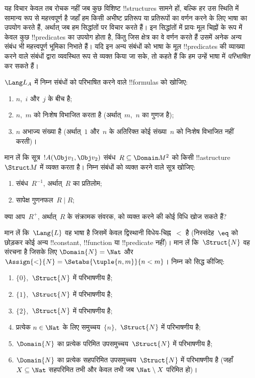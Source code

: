 \documentclass[../../../include/open-logic-section]{subfiles}
\begin{document}
\begin{explain}
यह विचार केवल तब रोचक नहीं जब कुछ विशिष्ट !!{structure}s सामने हों, बल्कि हर
उस स्थिति में सामान्य रूप से महत्त्वपूर्ण है जहाँ हम किसी अभीष्ट प्रतिरूप या प्रतिरूपों का
वर्णन करने के लिए भाषा का उपयोग करते हैं, अर्थात् जब हम सिद्धांतों पर विचार
करते हैं। इन सिद्धांतों में प्रायः मूल चिह्नों के रूप में केवल कुछ
!!{predicate}s का उपयोग होता है, किंतु जिस क्षेत्र का वे वर्णन करते हैं उसमें अनेक
अन्य संबंध भी महत्त्वपूर्ण भूमिका निभाते हैं। यदि इन अन्य संबंधों को भाषा के
मूल !!{predicate}s की व्याख्या करने वाले संबंधों द्वारा व्यवस्थित रूप से
व्यक्त किया जा सके, तो कहते हैं कि हम उन्हें भाषा में \emph{परिभाषित} कर सकते
हैं।
\end{explain}

\begin{prob}
$\Lang L_A$ में निम्न संबंधों को परिभाषित करने वाले !!{formula}s को खोजिए:
\begin{enumerate}
\item $n$,~$i$ और~$j$ के बीच है;
\item $n$,~$m$ को निःशेष विभाजित करता है (अर्थात्~$m$,~$n$ का गुणज है);
\item $n$ अभाज्य संख्या है (अर्थात्~$1$ और~$n$ के अतिरिक्त कोई संख्या~$n$ को
  निःशेष विभाजित नहीं करती)।
\end{enumerate}
\end{prob}

\begin{prob}
मान लें कि सूत्र~$!A(\Obj v_1, \Obj v_2)$ संबंध~$R
\subseteq \Domain M^2$ को किसी !!a{structure}~$\Struct M$ में व्यक्त करता है।
निम्न संबंधों को व्यक्त करने वाले सूत्र खोजिए:
\begin{enumerate}
\item संबंध~$R^{-1}$, अर्थात्~$R$ का प्रतिलोम;
\item सापेक्ष गुणनफल~$R \mid R$;
\end{enumerate}
क्या आप~$R^+$, अर्थात्~$R$ के संक्रामक संवरक, को व्यक्त करने की कोई विधि खोज सकते हैं?
\end{prob}

\begin{prob}
मान लें कि~$\Lang{L}$ वह भाषा है जिसमें केवल द्विस्थानी विधेय-चिह्न~$<$ है
(निस्संदेह~$\eq$ को छोड़कर कोई अन्य !!{constant}, !!{function} या
!!{predicate} नहीं)। मान लें कि~$\Struct{N}$ वह संरचना है जिसके लिए
$\Domain{N} = \Nat$ और $\Assign{<}{N} = \Setabs{\tuple{n,m}}{n <
  m}$।
निम्न को सिद्ध कीजिए:
\begin{enumerate}
\item $\{ 0 \}$,~$\Struct{N}$ में परिभाषणीय है;
\item $\{ 1 \}$,~$\Struct{N}$ में परिभाषणीय है;
\item $\{ 2 \}$,~$\Struct{N}$ में परिभाषणीय है;
\item प्रत्येक $n \in \Nat$ के लिए समुच्चय~$\{ n \}$,~$\Struct{N}$ में
  परिभाषणीय है;
\item $\Domain{N}$ का प्रत्येक परिमित उपसमुच्चय~$\Struct{N}$ में परिभाषणीय
  है;
\item $\Domain{N}$ का प्रत्येक सहपरिमित उपसमुच्चय~$\Struct{N}$ में
  परिभाषणीय है (जहाँ $X \subseteq \Nat$ सहपरिमित तभी और केवल तभी जब
  $\Nat \setminus X$ परिमित हो)।
\end{enumerate}
\end{prob}
\end{document}
